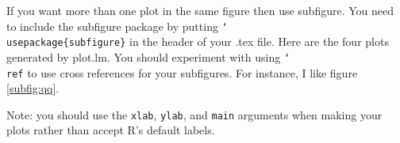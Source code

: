 \documentclass[12pt]{article}
\begin{document}
If you want more than one plot in the same figure then use subfigure.  You need to include the subfigure package by putting \texttt{\char`\\usepackage\{subfigure\}} in the header of your .tex file.  Here are the four plots generated by plot.lm.  You should experiment with using \texttt{\char`\\ref} to use cross references for your subfigures.  For instance, I like figure \ref{subfig:qq}.

Note: you should use the \texttt{xlab}, \texttt{ylab}, and \texttt{main} arguments when making your plots rather than accept R's default labels.

\begin{figure}[h]
\centering
{}
\end{figure}
\end{document}
